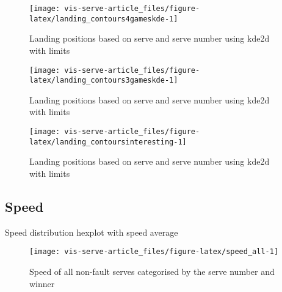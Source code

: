 \documentclass[article]{jss}
\begin{document}
\begin{CodeChunk}
\begin{figure}

{\centering \texttt{[image: vis-serve-article\_files/figure-latex/landing\_contours4gameskde-1]} 

}

\caption[Landing positions based on serve and serve number using kde2d with limits]{Landing positions based on serve and serve number using kde2d with limits}\label{fig:landing_contours4gameskde}
\end{figure}
\end{CodeChunk}

\begin{CodeChunk}
\begin{figure}

{\centering \texttt{[image: vis-serve-article\_files/figure-latex/landing\_contours3gameskde-1]} 

}

\caption[Landing positions based on serve and serve number using kde2d with limits]{Landing positions based on serve and serve number using kde2d with limits}\label{fig:landing_contours3gameskde}
\end{figure}
\end{CodeChunk}

\begin{CodeChunk}
\begin{figure}

{\centering \texttt{[image: vis-serve-article\_files/figure-latex/landing\_contoursinteresting-1]} 

}

\caption[Landing positions based on serve and serve number using kde2d with limits]{Landing positions based on serve and serve number using kde2d with limits}\label{fig:landing_contoursinteresting}
\end{figure}
\end{CodeChunk}

\subsection{Speed}\label{speed}

Speed distribution hexplot with speed average

\begin{CodeChunk}
\begin{figure}

{\centering \texttt{[image: vis-serve-article\_files/figure-latex/speed\_all-1]} 

}

\caption[Speed of all non-fault serves categorised by the serve number and winner]{Speed of all non-fault serves categorised by the serve number and winner}\label{fig:speed_all}
\end{figure}
\end{CodeChunk}
\end{document}

